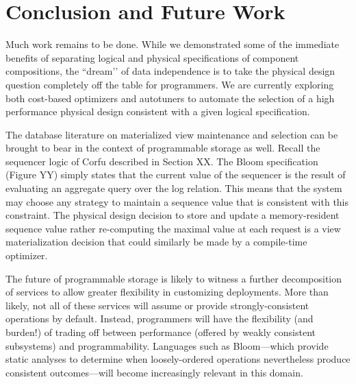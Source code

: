 \documentclass[10pt,twocolumn]{article}
\begin{document}
\section{Conclusion and Future Work}

Much work remains to be done.  While we demonstrated some of the immediate
benefits of separating logical and physical specifications of component
compositions, the ``dream’’ of data independence is to take the physical
design question completely off the table for programmers.  We are currently
exploring both cost-based optimizers and autotuners to automate the selection
of a high performance physical design consistent with a given logical
specification.  

The database literature on materialized view maintenance and selection can be
brought to bear in the context of programmable storage as well.  Recall the
sequencer logic of Corfu described in Section XX.  The Bloom specification
(Figure YY) simply states that the current value of the sequencer is the
result of evaluating an aggregate query over the log relation.  This means
that the system may choose any strategy to maintain a sequence value that is
consistent with this constraint.  The physical design decision to store and
update a memory-resident sequence value rather re-computing the maximal value
at each request is a view materialization decision that could similarly be
made by a compile-time optimizer.

The future of programmable storage is likely to witness a further
decomposition of services to allow greater flexibility in customizing
deployments.  More than likely, not all of these services will assume or
provide strongly-consistent operations by default.  Instead, programmers will
have the flexibility (and burden!) of trading off between performance (offered
by weakly consistent subsystems) and programmability.  Languages such as
Bloom---which provide static analyses to determine when loosely-ordered
operations nevertheless produce consistent outcomes---will become increasingly
relevant in this domain.




\end{document}
